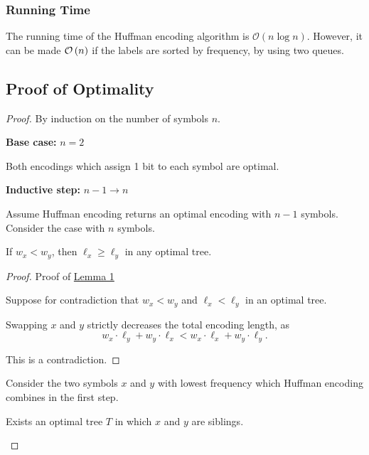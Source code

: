 \subsubsection{Running Time}

The running time of the Huffman encoding algorithm is $\mathcal{O}(n \log n)$. However, it can be made $\mathcal{O}\left(n\right)$ if the labels are sorted by frequency, by using two queues. 

\subsection{Proof of Optimality}

\begin{proof}
    By induction on the number of symbols $n$.

    \begin{listu}
        \item \textbf{Base case:} $n = 2$

        Both encodings which assign 1 bit to each symbol are optimal.

        \item \textbf{Inductive step:} $n - 1 \to n$

        Assume Huffman encoding returns an optimal encoding with $n - 1$ symbols. Consider the case with $n$ symbols.

        \begin{lemma*}[1]\label{lem:huffman-1}
            If $w_x < w_y$, then $\ell_x \ge \ell_y$ in any optimal tree.
        \end{lemma*}

        \begin{proof}
            Proof of \hyperref[lem:huffman-1]{Lemma 1}

            Suppose for contradiction that $w_x < w_y$ and $\ell_x < \ell_y$ in an optimal tree.

            Swapping $x$ and $y$ strictly decreases the total encoding length, as \[
                w_x \cdot \ell_y + w_y \cdot \ell_x < w_x \cdot \ell_x + w_y \cdot \ell_y.
            \]

            This is a contradiction.
        \end{proof}

        Consider the two symbols $x$ and $y$ with lowest frequency which Huffman encoding combines in the first step.

        \begin{lemma*}[2]\label{lem:huffman-2}
            Exists an optimal tree $T$ in which $x$ and $y$ are siblings.


\end{lemma*}
\end{listu}
\end{proof}
